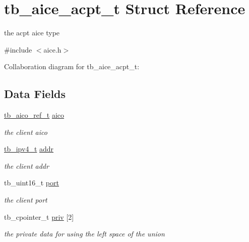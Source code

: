 \hypertarget{structtb__aice__acpt__t}{\section{tb\-\_\-aice\-\_\-acpt\-\_\-t Struct Reference}
\label{structtb__aice__acpt__t}
}


the acpt aice type  




{\ttfamily \#include $<$aice.\-h$>$}



Collaboration diagram for tb\-\_\-aice\-\_\-acpt\-\_\-t\-:
\subsection*{Data Fields}
\begin{DoxyCompactItemize}
\item 
\hypertarget{structtb__aice__acpt__t_a60b54df469ac3d4eae246983d0e8c9da}{\hyperlink{structtb__aico__ref__t}{tb\-\_\-aico\-\_\-ref\-\_\-t} \hyperlink{structtb__aice__acpt__t_a60b54df469ac3d4eae246983d0e8c9da}{aico}}\label{structtb__aice__acpt__t_a60b54df469ac3d4eae246983d0e8c9da}

\begin{DoxyCompactList}\small\item\em the client aico \end{DoxyCompactList}\item 
\hypertarget{structtb__aice__acpt__t_a2c04d55ed77a99e5535b3068e4e5f74b}{\hyperlink{uniontb__ipv4__t}{tb\-\_\-ipv4\-\_\-t} \hyperlink{structtb__aice__acpt__t_a2c04d55ed77a99e5535b3068e4e5f74b}{addr}}\label{structtb__aice__acpt__t_a2c04d55ed77a99e5535b3068e4e5f74b}

\begin{DoxyCompactList}\small\item\em the client addr \end{DoxyCompactList}\item 
\hypertarget{structtb__aice__acpt__t_ad9ca81c9c0111acf86094417a4d7e447}{tb\-\_\-uint16\-\_\-t \hyperlink{structtb__aice__acpt__t_ad9ca81c9c0111acf86094417a4d7e447}{port}}\label{structtb__aice__acpt__t_ad9ca81c9c0111acf86094417a4d7e447}

\begin{DoxyCompactList}\small\item\em the client port \end{DoxyCompactList}\item 
\hypertarget{structtb__aice__acpt__t_a683c5ffd19030bf13f3150504426b861}{tb\-\_\-cpointer\-\_\-t \hyperlink{structtb__aice__acpt__t_a683c5ffd19030bf13f3150504426b861}{priv} \mbox{[}2\mbox{]}}\label{structtb__aice__acpt__t_a683c5ffd19030bf13f3150504426b861}

\begin{DoxyCompactList}\small\item\em the private data for using the left space of the union \end{DoxyCompactList}\end{DoxyCompactItemize}


